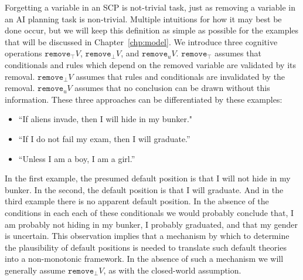 Forgetting a variable in an SCP is not-trivial task, just as removing a variable in an AI planning task is non-trivial. Multiple intuitions for how it may best be done occur, but we will keep this definition as simple as possible for the examples that will be discussed in Chapter~\ref{chp:model}. We introduce three cognitive operations $\texttt{remove}_\top V$, $\texttt{remove}_\bot V$, and $\texttt{remove}_u V$. $\texttt{remove}_\top$ assumes that conditionals and rules which depend on the removed variable are validated by its removal. $\texttt{remove}_\bot V$ assumes that rules and conditionals are invalidated by the removal. $\texttt{remove}_u V$ assumes that no conclusion can be drawn without this information.  These three approaches can be differentiated by these examples:

\begin{itemize}
\item ``If aliens invade, then I will hide in my bunker."
\item ``If I do not fail my exam, then I will graduate.''
\item ``Unless I am a boy, I am a girl.''
\end{itemize}

In the first example, the presumed default position is that I will not hide in my bunker. In the second, the default position is that I will graduate. And in the third example there is no apparent default position. In the absence of the conditions in each each of these conditionals we would probably conclude that, I am probably not hiding in my bunker, I probably graduated, and that my gender is uncertain. This observation implies that a mechanism by which to determine the plausibility of default positions is needed to translate such default theories into a non-monotonic framework. In the absence of such a mechanism we will generally assume $\texttt{remove}_\bot V$, as with the closed-world assumption.

